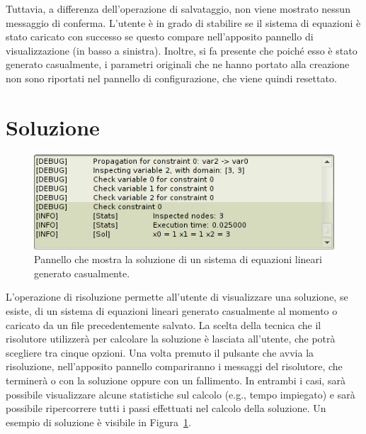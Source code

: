 \documentclass{article}
\begin{document}
Tuttavia, a differenza dell'operazione di salvataggio, non viene mostrato nessun messaggio di conferma. L'utente è in grado di stabilire se il sistema di equazioni è stato caricato con successo se questo compare nell'apposito pannello di visualizzazione (in basso a sinistra). Inoltre, si fa presente che poiché esso è stato generato casualmente, i parametri originali che ne hanno portato alla creazione non sono riportati nel pannello di configurazione, che viene quindi resettato.

\section{Soluzione}
\label{sec:soluzione}

\begin{figure}[htp!]
	\centering
	\includegraphics[scale=.5]{ug-images/solution.png}
	\caption{Pannello che mostra la soluzione di un sistema di equazioni lineari generato casualmente.}
	\label{fig:soluzione}
\end{figure}

L'operazione di risoluzione permette all'utente di visualizzare una soluzione, se esiste, di un sistema di equazioni lineari generato casualmente al momento o caricato da un file precedentemente salvato. La scelta della tecnica che il risolutore utilizzerà per calcolare la soluzione è lasciata all'utente, che potrà scegliere tra cinque opzioni. Una volta premuto il pulsante che avvia la risoluzione, nell'apposito pannello compariranno i messaggi del risolutore, che terminerà o con la soluzione oppure con un fallimento. In entrambi i casi, sarà possibile visualizzare alcune statistiche sul calcolo (e.g., tempo impiegato) e sarà possibile ripercorrere tutti i passi effettuati nel calcolo della soluzione. Un esempio di soluzione è visibile in Figura~\ref{fig:soluzione}.

\end{document}
